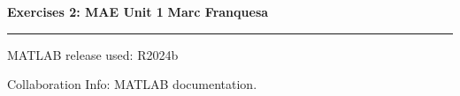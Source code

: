 \documentclass[a4paper,12pt]{report}
\begin{document}
{\Large{\textbf{Exercises 2: MAE Unit 1}} \hfill \textbf{Marc Franquesa}}
\hrule
\vspace{0.5cm}

MATLAB release used: R2024b

Collaboration Info: MATLAB documentation.

\bigskip

\begin{exlist}
    
\end{exlist}
\end{document}
